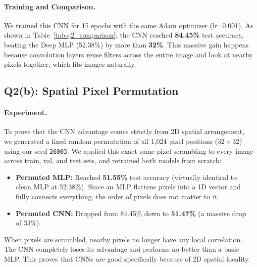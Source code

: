 \documentclass[10pt,twocolumn,letterpaper]{article}
\begin{document}
\paragraph{Training and Comparison.}
We trained this CNN for 15 epochs with the same Adam optimizer (lr=0.001). As shown in Table~\ref{tab:q2_comparison}, the CNN reached \textbf{84.45\%} test accuracy, beating the Deep MLP (52.38\%) by more than \textbf{32\%}. This massive gain happens because convolution layers reuse filters across the entire image and look at nearby pixels together, which fits images naturally.

\begin{table}[t]
\centering
\caption{\textbf{Q2 Summary Table: Test Accuracy under different conditions.}}
\label{tab:q2_comparison}
\end{table}

\subsection{Q2(b): Spatial Pixel Permutation}

\paragraph{Experiment.}
To prove that the CNN advantage comes strictly from 2D spatial arrangement, we generated a fixed random permutation of all 1,024 pixel positions ($32 \times 32$) using our seed \texttt{26003}. We applied this exact same pixel scrambling to every image across train, val, and test sets, and retrained both models from scratch:
\begin{itemize}
    \setlength{\itemsep}{1pt}
    \item \textbf{Permuted MLP:} Reached \textbf{51.55\%} test accuracy (virtually identical to clean MLP at 52.38\%). Since an MLP flattens pixels into a 1D vector and fully connects everything, the order of pixels does not matter to it.
    \item \textbf{Permuted CNN:} Dropped from 84.45\% down to \textbf{51.47\%} (a massive drop of 33\%).
\end{itemize}
When pixels are scrambled, nearby pixels no longer have any local correlation. The CNN completely loses its advantage and performs no better than a basic MLP. This proves that CNNs are good specifically because of 2D spatial locality.
\end{document}
